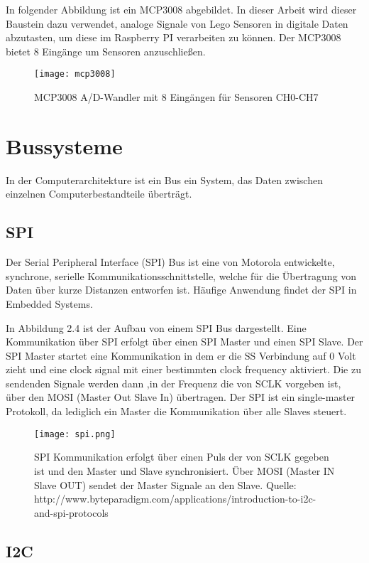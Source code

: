 In folgender Abbildung ist ein MCP3008 abgebildet. In dieser Arbeit wird dieser Baustein dazu verwendet, analoge Signale von Lego Sensoren in digitale Daten abzutasten, um diese im Raspberry PI verarbeiten zu können. Der MCP3008 bietet 8 Eingänge um Sensoren anzuschließen.

\begin{figure}[h]
  \centering
  \texttt{[image: mcp3008]}
  \caption{MCP3008 A/D-Wandler mit 8 Eingängen für Sensoren CH0-CH7}
  \label{Kap1:NXT}
\end{figure}

\section{Bussysteme}
In der Computerarchitekture ist ein Bus ein System, das Daten zwischen einzelnen Computerbestandteile überträgt.

\subsection{SPI}

Der Serial Peripheral Interface (SPI) Bus ist eine von Motorola entwickelte,  synchrone, serielle Kommunikationsschnittstelle, welche für die Übertragung von Daten über kurze Distanzen entworfen ist.  Häufige Anwendung findet der SPI in Embedded Systems. 

In Abbildung 2.4 ist der Aufbau von einem SPI Bus dargestellt.
Eine Kommunikation über SPI erfolgt über einen SPI Master und einen SPI Slave. Der SPI Master startet eine Kommunikation in dem er die SS Verbindung auf 0 Volt zieht und eine clock signal mit einer bestimmten clock frequency aktiviert. Die zu sendenden Signale werden dann ,in der Frequenz die von SCLK vorgeben ist, über den MOSI (Master Out Slave In) übertragen. Der SPI ist ein single-master Protokoll, da lediglich ein Master die Kommunikation über alle Slaves steuert.

\begin{figure}[h]
  \centering
  \texttt{[image: spi.png]}
  \caption{SPI Kommunikation erfolgt über einen Puls der von SCLK gegeben ist und den Master und Slave synchronisiert. Über MOSI (Master IN Slave OUT) sendet der Master Signale an den Slave. Quelle: http://www.byteparadigm.com/applications/introduction-to-i2c-and-spi-protocols}
  \label{Kap1:SPI}
\end{figure}

\subsection{I2C}

